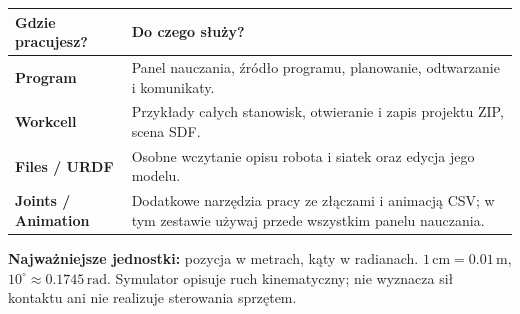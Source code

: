 \documentclass[10pt,a4paper]{article}
\newcommand{\ui}[1]{\textbf{\textsf{#1}}}
\begin{document}
\begin{tabularx}{\linewidth}{@{}lX@{}}\toprule
\textbf{Gdzie pracujesz?}&\textbf{Do czego służy?}\\\midrule
\ui{Program}&Panel nauczania, źródło programu, planowanie, odtwarzanie i komunikaty.\\
\ui{Workcell}&Przykłady całych stanowisk, otwieranie i zapis projektu ZIP, scena SDF.\\
\ui{Files / URDF}&Osobne wczytanie opisu robota i siatek oraz edycja jego modelu.\\
\ui{Joints / Animation}&Dodatkowe narzędzia pracy ze złączami i animacją CSV; w tym zestawie używaj przede wszystkim panelu nauczania.\\\bottomrule
\end{tabularx}
\begin{remember}\textbf{Najważniejsze jednostki:} pozycja w metrach, kąty w radianach. \(1\,\mathrm{cm}=0.01\,\mathrm{m}\), \(10^\circ\approx0.1745\,\mathrm{rad}\). Symulator opisuje ruch kinematyczny; nie wyznacza sił kontaktu ani nie realizuje sterowania sprzętem.\end{remember}
\end{document}
